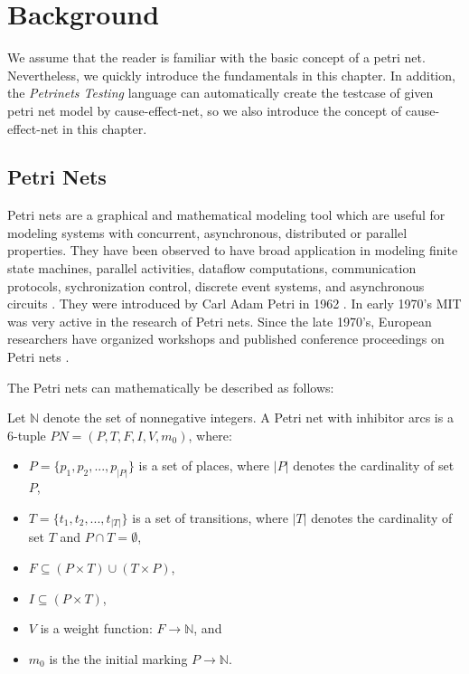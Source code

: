 
\section{Background}\label{sec:background}

We assume that the reader is familiar with the basic concept of a petri net. Nevertheless, we quickly introduce the fundamentals in this chapter. In addition, the \emph{Petrinets Testing} language can automatically create the testcase of given petri net model by cause-effect-net\cite{Desel1997}, so we also introduce the concept of cause-effect-net in this chapter.

\subsection{Petri Nets}\label{sec:background:definition}

Petri nets are a graphical and mathematical modeling tool which are useful for modeling systems with concurrent, asynchronous, distributed or parallel properties. They have been observed to have broad application in modeling ﬁnite state machines, parallel activities, dataﬂow computations, communication protocols, sychronization control, discrete event systems, and asynchronous circuits \cite{murata1989petri}. They were introduced by Carl Adam Petri in 1962 \cite{petri1962kommunikation}. In early 1970’s MIT was very active in the research of Petri nets. Since the late 1970’s, European researchers have organized workshops and published conference proceedings on Petri nets \cite{murata1989petri}.

The Petri nets can mathematically be described as follows:

Let $\mathbb{N}$ denote the set of nonnegative integers. A Petri net with inhibitor arcs is a 6-tuple $ PN = (P, T, F, I, V, m_0)$, where: 

\begin{itemize}
    \item $P=\{p_1, p_2, ... , p_{|P|} \}$ is a set of places, where $|P|$ denotes the cardinality of set $P$,
    \item $T = \{ t_1, t_2, ... , t_{|T|}\}$ is a set of transitions, where $|T|$ denotes the cardinality of set $T$ and $P \cap T = \emptyset $,
    \item $ F \subseteq (P \times T) \cup (T \times P)$,
    \item $ I \subseteq (P \times T)$,
    \item $V$ is a weight function: $F \rightarrow \mathbb{N}$, and
    \item $m_0$ is the the initial marking $P \rightarrow \mathbb{N}$.
\end{itemize}

